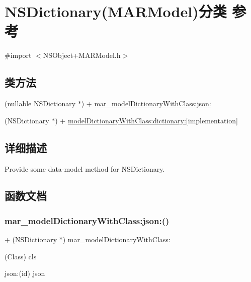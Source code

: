 \hypertarget{category_n_s_dictionary_07_m_a_r_model_08}{}\section{N\+S\+Dictionary(M\+A\+R\+Model)分类 参考}
\label{category_n_s_dictionary_07_m_a_r_model_08}


{\ttfamily \#import $<$N\+S\+Object+\+M\+A\+R\+Model.\+h$>$}

\subsection*{类方法}
\begin{DoxyCompactItemize}
\item 
(nullable N\+S\+Dictionary $\ast$) + \hyperlink{category_n_s_dictionary_07_m_a_r_model_08_a02b16dfd7737755ce10eff55b8ed0472}{mar\+\_\+model\+Dictionary\+With\+Class\+:json\+:}
\item 
(N\+S\+Dictionary $\ast$) + \hyperlink{category_n_s_dictionary_07_m_a_r_model_08_ac8320efb4be700de3645e2710d4aa6a1}{model\+Dictionary\+With\+Class\+:dictionary\+:}{\ttfamily  \mbox{[}implementation\mbox{]}}
\end{DoxyCompactItemize}


\subsection{详细描述}
Provide some data-\/model method for N\+S\+Dictionary. 

\subsection{函数文档}
\mbox{\label{category_n_s_dictionary_07_m_a_r_model_08_a02b16dfd7737755ce10eff55b8ed0472}} 
\subsubsection{\texorpdfstring{mar\+\_\+model\+Dictionary\+With\+Class\+:json\+:()}{mar\_modelDictionaryWithClass:json:()}}
{\footnotesize\ttfamily + (N\+S\+Dictionary $\ast$) mar\+\_\+model\+Dictionary\+With\+Class\+: \begin{DoxyParamCaption}\item[{(Class)}]{cls }\item[{json:(id)}]{json }\end{DoxyParamCaption}}


